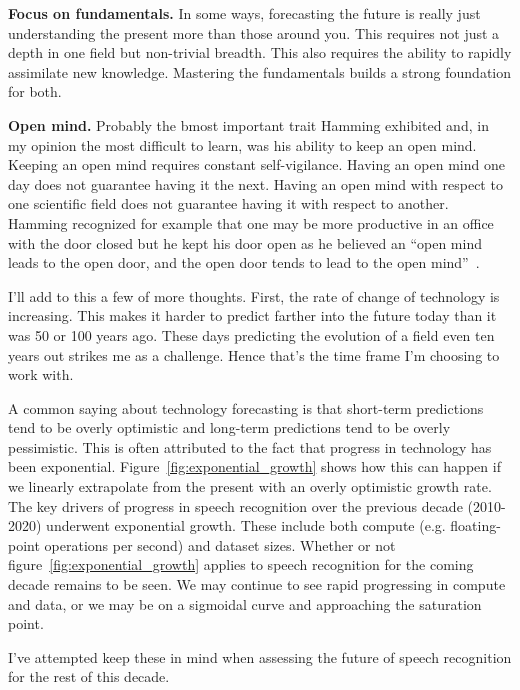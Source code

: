 {\bf Focus on fundamentals.} In some ways, forecasting the future is really
just understanding the present more than those around you. This requires not
just a depth in one field but non-trivial breadth. This also requires the
ability to rapidly assimilate new knowledge. Mastering the fundamentals builds
a strong foundation for both.

{\bf Open mind.} Probably the bmost important trait Hamming exhibited and, in
my opinion the most difficult to learn, was his ability to keep an open mind.
Keeping an open mind requires constant self-vigilance. Having an open mind one
day does not guarantee having it the next. Having an open mind with respect to
one scientific field does not guarantee having it with respect to another.
Hamming recognized for example that one may be more productive in an office
with the door closed but he kept his door open as he believed an ``open mind
leads to the open door, and the open door tends to lead to the open
mind''~\citep[chp. 30]{hamming1997art}.

I'll add to this a few of more thoughts. First, the rate of change of
technology is increasing. This makes it harder to predict farther into the
future today than it was 50 or 100 years ago. These days predicting the
evolution of a field even ten years out strikes me as a challenge. Hence that's
the time frame I'm choosing to work with.

A common saying about technology forecasting is that short-term predictions
tend to be overly optimistic and long-term predictions tend to be overly
pessimistic. This is often attributed to the fact that progress in technology
has been exponential. Figure~\ref{fig:exponential_growth} shows how this can
happen if we linearly extrapolate from the present with an overly optimistic
growth rate. The key drivers of progress in speech recognition over the
previous decade (2010-2020) underwent exponential growth. These include both
compute (e.g. floating-point operations per second) and dataset sizes. Whether
or not figure~\ref{fig:exponential_growth} applies to speech recognition for
the coming decade remains to be seen. We may continue to see rapid progressing
in compute and data, or we may be on a sigmoidal curve and approaching the
saturation point.

I've attempted keep these in mind when assessing the
future of speech recognition for the rest of this decade.

